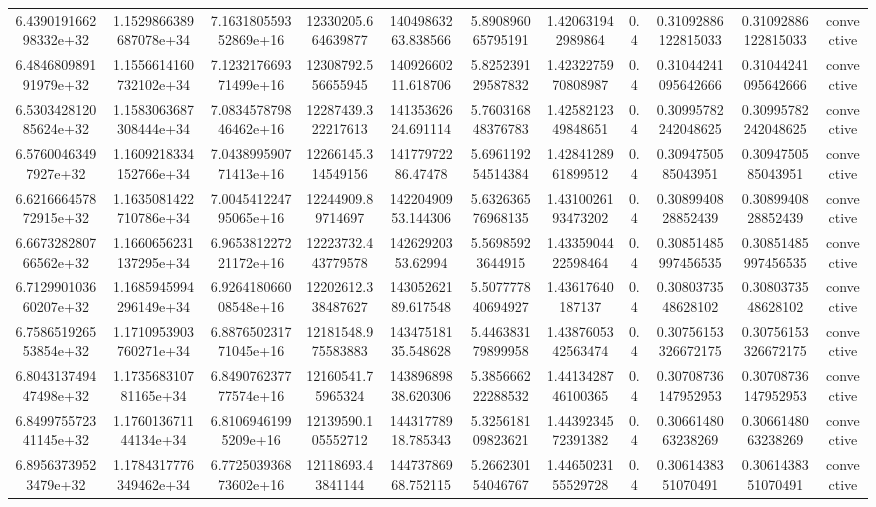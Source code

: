 \begin{table}
\begin{tabular}{ccccccccccc}
6.439019166298332e+32 & 1.1529866389687078e+34 & 7.163180559352869e+16 & 12330205.664639877 & 14049863263.838566 & 5.890896065795191 & 1.420631942989864 & 0.4 & 0.31092886122815033 & 0.31092886122815033 & convective \\
6.484680989191979e+32 & 1.1556614160732102e+34 & 7.123217669371499e+16 & 12308792.556655945 & 14092660211.618706 & 5.825239129587832 & 1.4232275970808987 & 0.4 & 0.31044241095642666 & 0.31044241095642666 & convective \\
6.530342812085624e+32 & 1.1583063687308444e+34 & 7.083457879846462e+16 & 12287439.322217613 & 14135362624.691114 & 5.760316848376783 & 1.4258212349848651 & 0.4 & 0.30995782242048625 & 0.30995782242048625 & convective \\
6.57600463497927e+32 & 1.1609218334152766e+34 & 7.043899590771413e+16 & 12266145.314549156 & 14177972286.47478 & 5.696119254514384 & 1.4284128961899512 & 0.4 & 0.3094750585043951 & 0.3094750585043951 & convective \\
6.621666457872915e+32 & 1.1635081422710786e+34 & 7.004541224795065e+16 & 12244909.89714697 & 14220490953.144306 & 5.632636576968135 & 1.4310026193473202 & 0.4 & 0.3089940828852439 & 0.3089940828852439 & convective \\
6.667328280766562e+32 & 1.1660656231137295e+34 & 6.965381227221172e+16 & 12223732.443779578 & 14262920353.62994 & 5.56985923644915 & 1.4335904422598464 & 0.4 & 0.30851485997456535 & 0.30851485997456535 & convective \\
6.712990103660207e+32 & 1.1685945994296149e+34 & 6.926418066008548e+16 & 12202612.338487627 & 14305262189.617548 & 5.507777840694927 & 1.43617640187137 & 0.4 & 0.3080373548628102 & 0.3080373548628102 & convective \\
6.758651926553854e+32 & 1.1710953903760271e+34 & 6.887650231771045e+16 & 12181548.975583883 & 14347518135.548628 & 5.446383179899958 & 1.4387605342563474 & 0.4 & 0.30756153326672175 & 0.30756153326672175 & convective \\
6.804313749447498e+32 & 1.173568310781165e+34 & 6.849076237777574e+16 & 12160541.75965324 & 14389689838.620306 & 5.385666222288532 & 1.4413428746100365 & 0.4 & 0.30708736147952953 & 0.30708736147952953 & convective \\
6.849975572341145e+32 & 1.176013671144134e+34 & 6.81069461995209e+16 & 12139590.105552712 & 14431778918.785343 & 5.325618109823621 & 1.4439234572391382 & 0.4 & 0.3066148063238269 & 0.3066148063238269 & convective \\
6.89563739523479e+32 & 1.1784317776349462e+34 & 6.772503936873602e+16 & 12118693.43841144 & 14473786968.752115 & 5.266230154046767 & 1.4465023155529728 & 0.4 & 0.3061438351070491 & 0.3061438351070491 & convective \\

\end{tabular}
\end{table}
